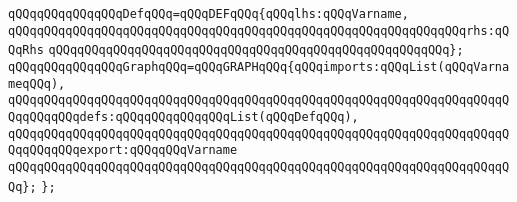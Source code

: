 \newline
\verb|qQQqqQQqqQQqqQQqDefqQQq=qQQqDEFqQQq{qQQqlhs:qQQqVarname,|\newline
\verb|qQQqqQQqqQQqqQQqqQQqqQQqqQQqqQQqqQQqqQQqqQQqqQQqqQQqqQQqqQQqqQQqrhs:qQQqRhs|\newline
\verb|qQQqqQQqqQQqqQQqqQQqqQQqqQQqqQQqqQQqqQQqqQQqqQQqqQQqqQQq};|\newline
\newline
\verb|qQQqqQQqqQQqqQQqGraphqQQq=qQQqGRAPHqQQq{qQQqimports:qQQqList(qQQqVarnameqQQq),|\newline
\verb|qQQqqQQqqQQqqQQqqQQqqQQqqQQqqQQqqQQqqQQqqQQqqQQqqQQqqQQqqQQqqQQqqQQqqQQqqQQqqQQqdefs:qQQqqQQqqQQqqQQqList(qQQqDefqQQq),|\newline
\verb|qQQqqQQqqQQqqQQqqQQqqQQqqQQqqQQqqQQqqQQqqQQqqQQqqQQqqQQqqQQqqQQqqQQqqQQqqQQqqQQqexport:qQQqqQQqVarname|\newline
\verb|qQQqqQQqqQQqqQQqqQQqqQQqqQQqqQQqqQQqqQQqqQQqqQQqqQQqqQQqqQQqqQQqqQQqqQQq};|\newline
\verb|};|\newline

